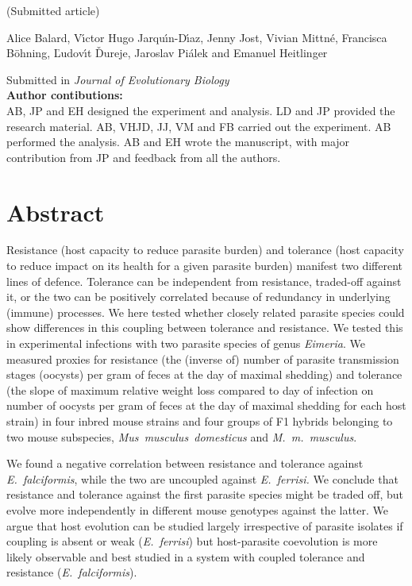 (Submitted article) \par

Alice Balard, V{\'{\i}}ctor Hugo Jarqu{\'{\i}}n-D{\'{\i}}az, Jenny Jost, Vivian Mittné, Francisca Böhning, {\v{L}}udov{\'{\i}}t {\v{D}}ureje, Jaroslav Pi{\'{a}}lek and Emanuel Heitlinger \par

Submitted in \textit{Journal of Evolutionary Biology}\\
\textbf{Author contibutions:}\\
AB, JP and EH designed the experiment and analysis. LD and JP provided the research material. AB, VHJD, JJ, VM and FB carried out the experiment. AB performed the analysis. AB and EH wrote the manuscript, with major contribution from JP and feedback from all the authors. \par

\newpage

\section{Abstract}
Resistance (host capacity to reduce parasite burden) and tolerance (host capacity to reduce impact on its health for a given parasite burden) manifest two different lines of defence. Tolerance can be independent from resistance, traded-off against it, or the two can be positively correlated because of redundancy in underlying (immune) processes. We here tested whether closely related parasite species could show differences in this coupling between tolerance and resistance. 
We tested this in experimental infections with two parasite species of genus \textit{Eimeria}. We measured proxies for resistance (the (inverse of) number of parasite transmission stages (oocysts) per gram of feces at the day of maximal shedding) and tolerance (the slope of maximum relative weight loss compared to day of infection on number of oocysts per gram of feces at the day of maximal shedding for each host strain) in four inbred mouse strains and four groups of F1 hybrids belonging to two mouse subspecies, \textit{Mus~musculus~domesticus} and \textit{M.~m.~musculus}.

We found a negative correlation between resistance and tolerance against \textit{E.~falciformis}, while the two are uncoupled against \textit{E.~ferrisi.} We conclude that resistance and tolerance against the first parasite species might be traded off, but evolve more independently in different mouse genotypes against the latter. We argue that host evolution can be studied largely irrespective of parasite isolates if coupling is absent or weak (\textit{E.~ferrisi}) but host-parasite coevolution is more likely observable and best studied in a system with coupled tolerance and resistance (\textit{E.~falciformis}). 

